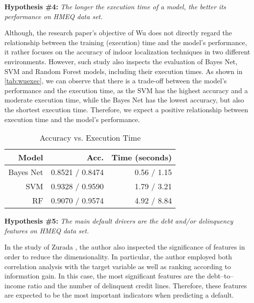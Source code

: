 \vspace{0.5cm}


\noindent \textbf{Hypothesis \#4:} \textit{The longer the execution time of a model, the better its performance on HMEQ data set.}

Although, the research paper's objective of Wu \citep{wu2018accurate} does not directly regard the relationship between the training (execution) time and the model's performance, it rather focuses on the accuracy of indoor localization techniques in two different environments.
However, such study also inspects the evaluation of Bayes Net, SVM and Random Forest models, including their execution times. As shown in \autoref{tab:wuexec}, we can observe that there is a trade-off between the model's performance and the execution time, as the SVM has the highest accuracy and a moderate execution time, while the Bayes Net has the lowest accuracy, but also the shortest execution time.
Therefore, we expect a positive relationship between execution time and the model's performance.

\begin{table}[H]
    \small
    \setlength{\tabcolsep}{8pt}
    \renewcommand{\arraystretch}{1.3}
    \centering
    \caption[Accuracy vs. Execution Time \citep{wu2018accurate}]{Accuracy vs. Execution Time \citep{wu2018accurate}}\label{tab:wuexec}
    \begin{tabular}{r r r}
    \toprule
    \textbf{Model} & \textbf{Acc.} & \textbf{Time (seconds)} \\
    \midrule
    \hline
    Bayes Net & 0.8521 / 0.8474 & 0.56 / 1.15 \\
    SVM & 0.9328 / 0.9590 & 1.79 / 3.21 \\
    RF & 0.9070 / 0.9574 & 4.92 / 8.84 \\

    \hline
    \bottomrule
    \end{tabular}
    \vspace{0.35em}
    
    \vspace{-1em}
\end{table}

\vspace{0.5cm}

\noindent \textbf{Hypothesis \#5:} \textit{The main default drivers are the debt and/or delinquency features on HMEQ data set.}

In the study of Zurada \citep{zurada2014classification}, the author also inspected the significance of features in order to reduce the dimensionality. In particular, the author employed both correlation analysis with the target variable as well as ranking according to information gain.
In this case, the most significant features are the debt--to--income ratio and the number of delinquent credit lines.
Therefore, these features are expected to be the most important indicators when predicting a default.